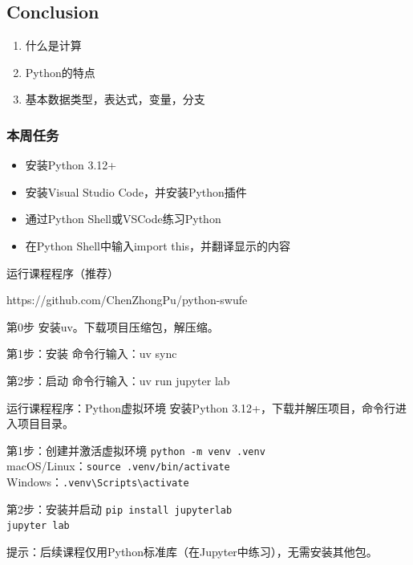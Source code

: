 \documentclass[aspectratio=169, 14pt]{beamer}
\begin{document}
\begin{frame}
	\section{\textcolor{darkmidnightblue}{Conclusion}}
	\begin{enumerate}
		\item 什么是计算
		\item Python的特点
		\item 基本数据类型，表达式，变量，分支
	\end{enumerate}
\end{frame}

\begin{frame}
	\frametitle{本周任务}
	\begin{itemize}
		\item 安装Python 3.12+
		\item 安装Visual Studio Code，并安装Python插件
		\item 通过Python Shell或VSCode练习Python
		\item 在Python Shell中输入\alert{import this}，并翻译显示的内容
	\end{itemize}
\end{frame}

\begin{frame}{运行课程程序（推荐）}

	https://github.com/ChenZhongPu/python-swufe

	\begin{block}{第0步}
		安装uv。下载项目压缩包，解压缩。
	\end{block}
	\begin{block}{第1步：安装}
		命令行输入：uv sync
	\end{block}
	\begin{block}{第2步：启动}
		命令行输入：uv run jupyter lab
	\end{block}
\end{frame}

\begin{frame}[fragile]{运行课程程序：Python虚拟环境}
	安装Python 3.12+，下载并解压项目，命令行进入项目目录。
	\begin{block}{第1步：创建并激活虚拟环境}
		\small
		\verb|python -m venv .venv| \\
		macOS/Linux：\verb|source .venv/bin/activate| \\
		Windows：\verb|.venv\Scripts\activate|
	\end{block}
	\begin{block}{第2步：安装并启动}
		\small
		\verb|pip install jupyterlab| \\
		\verb|jupyter lab|
	\end{block}
	{\footnotesize 提示：后续课程仅用Python标准库（在Jupyter中练习），无需安装其他包。}
\end{frame}
\end{document}
